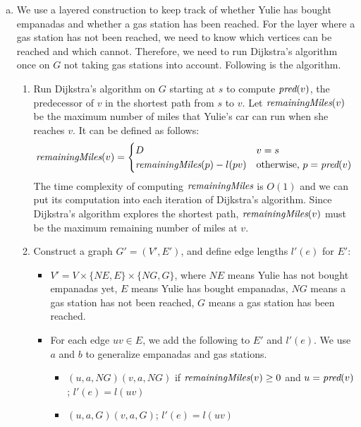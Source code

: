 \documentclass[11pt]{article}
\begin{document}



\begin{solution}
\begin{enumerate}[(a)]
\item We use a layered construction to keep track of whether Yulie has bought empanadas and whether a gas station has been reached. For the layer where a gas station has not been reached, we need to know which vertices can be reached and which cannot. Therefore, we need to run Dijkstra's algorithm once on $G$ not taking gas stations into account. Following is the algorithm.
\begin{enumerate}[(1)]
\item Run Dijkstra's algorithm on $G$ starting at $s$ to compute $\emph{pred}(v)$, the predecessor of $v$ in the shortest path from $s$ to $v$. Let $\emph{remainingMiles}(v)$ be the maximum number of miles that Yulie's car can run when she reaches $v$. It can be defined as follows:
\begin{equation*}
\emph{remainingMiles}(v)=
\begin{cases}
	D &v=s
\\	\emph{remainingMiles}(p) - l(pv) &\text{otherwise, }p=\emph{pred}(v)
\end{cases}
\end{equation*}
The time complexity of computing $\emph{remainingMiles}$ is $O(1)$ and we can put its computation into each iteration of Dijkstra's algorithm. Since Dijkstra's algorithm explores the shortest path, $\emph{remainingMiles}(v)$ must be the maximum remaining number of miles at $v$.
\item Construct a graph $G'=(V', E')$, and define edge lengths $l'(e)$ for $E'$:
\begin{itemize}
\item $V'=V\times \{NE,E\} \times \{NG,G\}$, where $NE$ means Yulie has not bought empanadas yet, $E$ means Yulie has bought empanadas, $NG$ means a gas station has not been reached, $G$ means a gas station has been reached.
\item For each edge $uv\in E$, we add the following to $E'$ and $l'(e)$. We use $a$ and $b$ to generalize empanadas and gas stations.
\begin{itemize}
\item $(u, a, NG)(v, a, NG)$ if $\emph{remainingMiles}(v)\ge 0$ and $u=\emph{pred}(v)$; $l'(e)=l(uv)$
\item $(u, a, G)(v, a, G)$; $l'(e)=l(uv)$

\end{itemize}
\end{itemize}
\end{enumerate}
\end{enumerate}
\end{solution}
\end{document}
